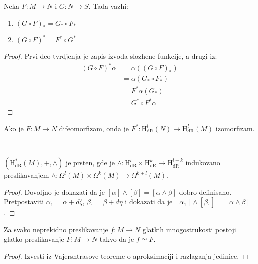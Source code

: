 \documentclass[a4paper,12pt]{article}
\newcommand{\hdr}[1]{\mathrm{H}_\mathrm{dR}^{#1}}
\begin{document}
\newpage
\begin{tvr}
	Neka $F:M\to N$ i $G:N\to S$. Tada vazhi:
	\begin{enumerate}
		\item \( (G\circ F)_* = G_* \circ F_* \) 
		\item \( (G\circ F)^* = F^* \circ G^* \) 
	\end{enumerate}
\end{tvr}

\begin{proof}
	Prvi deo tvrdjenja je zapis izvoda slozhene funkcije, a drugi iz:
	\begin{align*}
		(G\circ F)^* \alpha &= \alpha((G\circ F)_*) \\
		&= \alpha(G_* \circ F_*) \\
		&= F^* \alpha(G_*) \\
		&= G^* \circ F^* \alpha
	\end{align*}
\end{proof}

\begin{posl}
Ako je $F: M \to N$ difeomorfizam, onda je $F^* : \hdr{l} (N) \to \hdr{l} (M)$ izomorfi\-zam.
\end{posl}\\

\begin{tvr}
	$(\hdr{*}(M), +, \wedge)$ je prsten, gde je $\wedge:\hdr{l} \times \hdr{k} \to \hdr{l+k}$ indukovano preslikavanjem
	$\wedge: \Omega^l(M) \times \Omega^{k}(M) \to \Omega^{k+l}(M)$.
\end{tvr}

\begin{proof}
	Dovoljno je dokazati da je $[\alpha] \wedge [\beta] = [\alpha \wedge \beta]$ dobro definisano. Pretpostaviti $\alpha_1 = \alpha + d\zeta$, 
	$\beta_1 = \beta + d\eta$ i dokazati da je $[\alpha_1] \wedge [\beta_1] = [\alpha \wedge\beta]$.
\end{proof}

\begin{tvr}
Za svako neprekidno preslikavanje $f: M \to N$ glatkih mnogostrukosti postoji glatko preslikavanje $F:M \to N$ takvo da je $f \simeq F$.
\end{tvr}

\begin{proof}
Izvesti iz Vajershtrasove teoreme o aproksimaciji i razlaganja jedinice. 
\end{proof}
\end{document}
